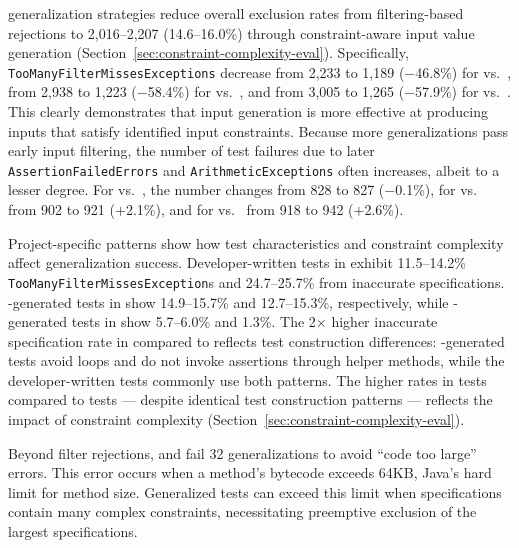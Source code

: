 \VariantImproved{} generalization strategies
reduce overall exclusion rates from filtering-based rejections
to 2,016--2,207 (14.6--16.0\%) through constraint-aware input value generation
(Section~\ref{sec:constraint-complexity-eval}).
Specifically, \texttt{Too\-Many\-Filter\-Misses\-Exceptions} decrease
from 2,233 to 1,189 ($-$46.8\%) for \VariantNaiveA{} vs.\ \VariantImprovedA{},
from 2,938 to 1,223 ($-$58.4\%) for \VariantNaiveB{} vs.\ \VariantImprovedB{},
and from 3,005 to 1,265 ($-$57.9\%) for \VariantNaiveC{} vs.\ \VariantImprovedC{}.
This clearly demonstrates that \VariantImproved{} input generation is more effective
at producing inputs that satisfy identified input constraints.
Because more generalizations pass early input filtering,
the number of test failures due to later \texttt{AssertionFailedErrors} and \texttt{ArithmeticExceptions}
often increases, albeit to a lesser degree.
For \VariantNaiveA{} vs.\ \VariantImprovedA{}, the number changes from 828 to 827 ($-$0.1\%),
for \VariantNaiveB{} vs.\ \VariantImprovedB{} from 902 to 921 ($+$2.1\%),
and for \VariantNaiveC{} vs.\ \VariantImprovedC{} from 918 to 942 ($+$2.6\%).

Project-specific patterns show how test characteristics
and constraint complexity affect generalization success.
Developer-written tests in \DatasetCommonsDev{}
exhibit 11.5--14.2\% \texttt{Too\-Many\-Filter\-Misses\-Exception}s
and 24.7--25.7\% from inaccurate specifications.
\ToolEvoSuite{}-generated tests in \DatasetsCommonsEs{} show 14.9--15.7\% and 12.7--15.3\%, respectively,
while \ToolEvoSuite{}-generated tests in \DatasetsEqBenchEs{} show 5.7--6.0\% and 1.3\%.
The 2$\times$ higher inaccurate specification rate
in \DatasetCommonsDev{} compared to \DatasetsCommonsEs{}
reflects test construction differences:
\ToolEvoSuite{}-generated tests avoid loops and do not invoke assertions through helper methods,
while the developer-written tests commonly use both patterns.
The higher rates in \DatasetsCommonsEs{} tests
compared to \DatasetsEqBenchEs{} tests --- despite identical test construction
patterns --- reflects the impact of constraint complexity (Section~\ref{sec:constraint-complexity-eval}).

Beyond filter rejections, \VariantNaive{} and \VariantImproved{}
fail 32 generalizations
to avoid ``code too large'' errors.
This error occurs when a method's bytecode exceeds 64KB,
Java's hard limit for method size.
Generalized tests can exceed this limit
when specifications contain many complex constraints,
necessitating preemptive exclusion of the largest specifications.

